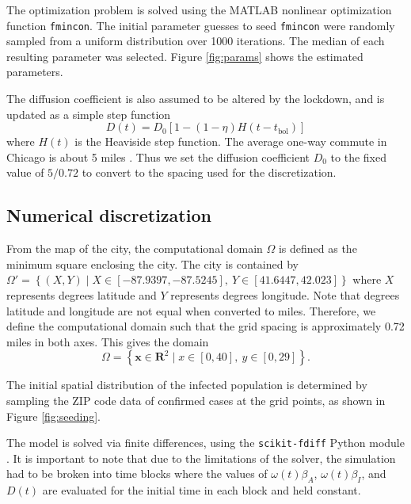 \documentclass[11pt]{article}
\newcommand{\R}{\mathbf{R}}
\renewcommand\vec{\mathbf}
\begin{document}
		The optimization problem is solved using the MATLAB nonlinear optimization function \verb|fmincon|.
		The initial parameter guesses to seed \verb|fmincon| were randomly sampled from a uniform distribution over 1000 iterations.
		The median of each resulting parameter was selected.
		Figure \ref{fig:params} shows the estimated parameters.
		
		The diffusion coefficient is also assumed to be altered by the lockdown, and is updated as a simple step function
			\begin{equation} \label{eq:diffusion}
				D(t) = D_0 \left[ 1 - (1 - \eta) H (t - t_\mathrm{bol}) \right]
			\end{equation}
		where $H(t)$ is the Heaviside step function.
		The average one-way commute in Chicago is about 5 miles \cite{travel}.
		Thus we set the diffusion coefficient $D_0$ to the fixed value of $5 / 0.72$ to convert to the spacing used for the discretization.
	
	\subsection{Numerical discretization}
		From the map of the city, the computational domain $\Omega$ is defined as the minimum square enclosing the city.
		The city is contained by $\Omega' = \left\{ (X,Y) \mid X \in [-87.9397, -87.5245], \ Y \in [41.6447, 42.023] \right\}$ where $X$ represents degrees latitude and $Y$ represents degrees longitude.
		Note that degrees latitude and longitude are not equal when converted to miles.
		Therefore, we define the computational domain such that the grid spacing is approximately 0.72 miles in both axes.
		This gives the domain
		\begin{equation} \label{eq:domain}
			\Omega = \left\{ \vec{x} \in \R^2 \mid x \in [0, 40], \ y \in [0, 29] \right\}.
		\end{equation}
		
		The initial spatial distribution of the infected population is determined by sampling the ZIP code data of confirmed cases \cite{Chicago-zips} at the grid points, as shown in Figure \ref{fig:seeding}.
		
		The model is solved via finite differences, using the \verb|scikit-fdiff| Python module \cite{nicolas_cellier_2019_3236970}.
		It is important to note that due to the limitations of the solver, the simulation had to be broken into time blocks where the values of $\omega (t) \beta_A$, $\omega (t) \beta_I$, and $D(t)$ are evaluated for the initial time in each block and held constant.
	
\end{document}
